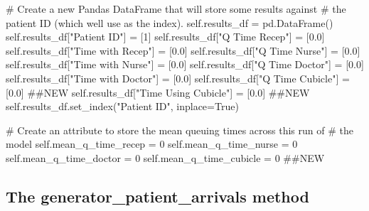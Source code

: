 \documentclass[
  letterpaper,
  DIV=11,
  numbers=noendperiod]{scrreprt}
\newenvironment{Shaded}{\begin{snugshade}}{\end{snugshade}}
\newcommand{\CommentTok}[1]{\textcolor[rgb]{0.37,0.37,0.37}{#1}}
\newcommand{\DecValTok}[1]{\textcolor[rgb]{0.68,0.00,0.00}{#1}}
\newcommand{\FloatTok}[1]{\textcolor[rgb]{0.68,0.00,0.00}{#1}}
\newcommand{\NormalTok}[1]{\textcolor[rgb]{0.00,0.23,0.31}{#1}}
\newcommand{\OperatorTok}[1]{\textcolor[rgb]{0.37,0.37,0.37}{#1}}
\newcommand{\StringTok}[1]{\textcolor[rgb]{0.13,0.47,0.30}{#1}}
\newcommand{\VariableTok}[1]{\textcolor[rgb]{0.07,0.07,0.07}{#1}}
\begin{document}
\begin{Shaded}
\begin{Highlighting}[]
        \CommentTok{\# Create a new Pandas DataFrame that will store some results against}
        \CommentTok{\# the patient ID (which we\textquotesingle{}ll use as the index).}
        \VariableTok{self}\NormalTok{.results\_df }\OperatorTok{=}\NormalTok{ pd.DataFrame()}
        \VariableTok{self}\NormalTok{.results\_df[}\StringTok{"Patient ID"}\NormalTok{] }\OperatorTok{=}\NormalTok{ [}\DecValTok{1}\NormalTok{]}
        \VariableTok{self}\NormalTok{.results\_df[}\StringTok{"Q Time Recep"}\NormalTok{] }\OperatorTok{=}\NormalTok{ [}\FloatTok{0.0}\NormalTok{]}
        \VariableTok{self}\NormalTok{.results\_df[}\StringTok{"Time with Recep"}\NormalTok{] }\OperatorTok{=}\NormalTok{ [}\FloatTok{0.0}\NormalTok{]}
        \VariableTok{self}\NormalTok{.results\_df[}\StringTok{"Q Time Nurse"}\NormalTok{] }\OperatorTok{=}\NormalTok{ [}\FloatTok{0.0}\NormalTok{]}
        \VariableTok{self}\NormalTok{.results\_df[}\StringTok{"Time with Nurse"}\NormalTok{] }\OperatorTok{=}\NormalTok{ [}\FloatTok{0.0}\NormalTok{]}
        \VariableTok{self}\NormalTok{.results\_df[}\StringTok{"Q Time Doctor"}\NormalTok{] }\OperatorTok{=}\NormalTok{ [}\FloatTok{0.0}\NormalTok{]}
        \VariableTok{self}\NormalTok{.results\_df[}\StringTok{"Time with Doctor"}\NormalTok{] }\OperatorTok{=}\NormalTok{ [}\FloatTok{0.0}\NormalTok{]}
        \VariableTok{self}\NormalTok{.results\_df[}\StringTok{"Q Time Cubicle"}\NormalTok{] }\OperatorTok{=}\NormalTok{ [}\FloatTok{0.0}\NormalTok{] }\CommentTok{\#\#NEW}
        \VariableTok{self}\NormalTok{.results\_df[}\StringTok{"Time Using Cubicle"}\NormalTok{] }\OperatorTok{=}\NormalTok{ [}\FloatTok{0.0}\NormalTok{] }\CommentTok{\#\#NEW}
        \VariableTok{self}\NormalTok{.results\_df.set\_index(}\StringTok{"Patient ID"}\NormalTok{, inplace}\OperatorTok{=}\VariableTok{True}\NormalTok{)}

        \CommentTok{\# Create an attribute to store the mean queuing times across this run of}
        \CommentTok{\# the model}
        \VariableTok{self}\NormalTok{.mean\_q\_time\_recep }\OperatorTok{=} \DecValTok{0}
        \VariableTok{self}\NormalTok{.mean\_q\_time\_nurse }\OperatorTok{=} \DecValTok{0}
        \VariableTok{self}\NormalTok{.mean\_q\_time\_doctor }\OperatorTok{=} \DecValTok{0}
        \VariableTok{self}\NormalTok{.mean\_q\_time\_cubicle }\OperatorTok{=} \DecValTok{0} \CommentTok{\#\#NEW}
\end{Highlighting}
\end{Shaded}

\subsection{The generator\_patient\_arrivals
method}\label{the-generator_patient_arrivals-method-2}
\end{document}
